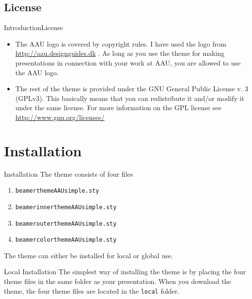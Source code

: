\documentclass[10pt]{beamer}
\newcommand{\chref}[2]{%
  \href{#1}{{\usebeamercolor[bg]{AAUsimple}#2}}%
}
\begin{document}
\subsection{License}
\begin{frame}{Introduction}{License}
  \begin{itemize}
    \item<1-> The AAU logo is covered by copyright rules. I have used the logo from \chref{http://aau.designguides.dk}{http://aau.designguides.dk}. As long as you use the theme for making presentations in connection with your work at AAU, you are allowed to use the AAU logo.
    \item<2-> The rest of the theme is provided under the GNU General Public License v. 3 (GPLv3). This basically means that you can redistribute it and/or modify it under the same license. For more information on the GPL license see \chref{http://www.gnu.org/licenses/}{http://www.gnu.org/licenses/}
  \end{itemize}
\end{frame}

\section{Installation}
\begin{frame}{Installation}
  The theme consists of four files
  \begin{enumerate}
    \item {\tt beamerthemeAAUsimple.sty}
    \item {\tt beamerinnerthemeAAUsimple.sty}
    \item {\tt beamerouterthemeAAUsimple.sty}
    \item {\tt beamercolorthemeAAUsimple.sty}
  \end{enumerate}
  The theme can either be installed for local or global use.
  \pause
  \begin{block}{Local Installation}
    The simplest way of installing the theme is by placing the four theme files in the same folder as your presentation. When you download the theme, the four theme files are located in the {\tt local} folder.
  \end{block}
\end{frame}
\end{document}
